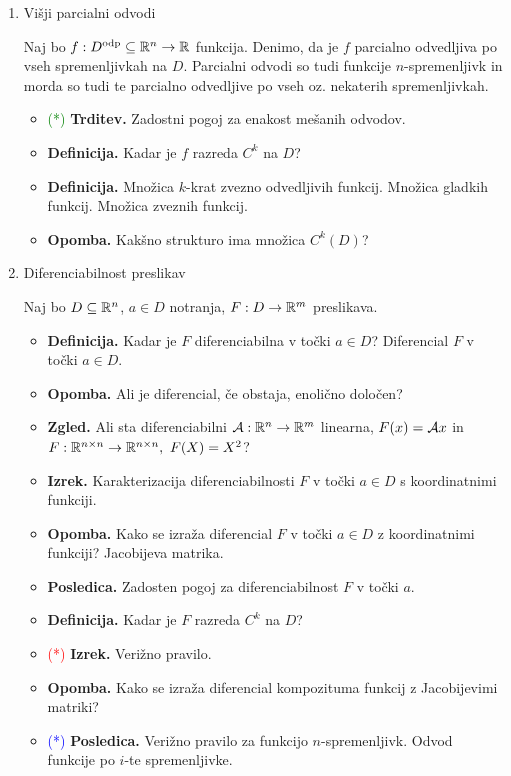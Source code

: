 \begin{enumerate}
    \item Višji parcialni odvodi
    
    Naj bo $f: D^\text{odp} \subseteq \mathbb{R}^n \to \mathbb{R}$ funkcija. Denimo, da je $f$ parcialno odvedljiva po vseh spremenljivkah na $D$. Parcialni odvodi so tudi funkcije $n$-spremenljivk in morda so tudi te parcialno odvedljive po vseh oz. nekaterih spremenljivkah.
    
    \begin{itemize}
        \item \textcolor{green}{(*)} \textbf{Trditev.} Zadostni pogoj za enakost mešanih odvodov.
        \item \textbf{Definicija.} Kadar je $f$ razreda $C^k$ na $D$?
        \item \textbf{Definicija.}  Množica $k$-krat zvezno odvedljivih funkcij. Množica gladkih funkcij. Množica zveznih funkcij.
        \item \textbf{Opomba.} Kakšno strukturo ima množica $C^k(D)$?
    \end{itemize}

    \item Diferenciabilnost preslikav
    
    Naj bo $D \subseteq \mathbb{R}^n$, $a \in D$ notranja, $F: D \to \mathbb{R}^m$ preslikava.
    \begin{itemize}
        \item \textbf{Definicija.} Kadar je $F$ diferenciabilna v točki $a \in D$? Diferencial $F$ v točki $a \in D$.
        \item \textbf{Opomba.} Ali je diferencial, če obstaja, enolično določen?
        \item \textbf{Zgled.} Ali sta diferenciabilni $\mathcal{A}: \mathbb{R}^n \to \mathbb{R}^m$ linearna, $F(x) = \mathcal{A}x$ in $F: 
        \mathbb{R}^{n \times n} \to \mathbb{R}^{n \times n}, \ F(X) = X^2$?
        \item \textbf{Izrek.} Karakterizacija diferenciabilnosti $F$ v točki $a \in D$ s koordinatnimi funkciji. 
        \item \textbf{Opomba.} Kako se izraža diferencial $F$ v točki $a \in D$ z koordinatnimi funkciji? Jacobijeva matrika.
        \item \textbf{Posledica.} Zadosten pogoj za diferenciabilnost $F$ v točki $a$.
        \item \textbf{Definicija.} Kadar je $F$ razreda $C^k$ na $D$?
        \item \textcolor{red}{(*)} \textbf{Izrek.} Verižno pravilo.
        \item \textbf{Opomba.} Kako se izraža diferencial kompozituma funkcij z Jacobijevimi matriki?
        \item \textcolor{blue}{(*)} \textbf{Posledica.} Verižno pravilo za funkcijo $n$-spremenljivk. Odvod funkcije po \(i\)-te spremenljivke.
    \end{itemize}
\end{enumerate}

